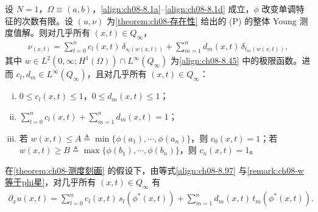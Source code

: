 \documentclass[../../main.tex]{subfiles}%
\begin{document}
\begin{theorem}\label{theorem:ch08-测度刻画}
设 $N=1$，$\Omega\equiv(a,b)$，\eqref{align:ch08-8.1a}--\eqref{align:ch08-8.1d} 成立，$\phi$ 改变单调特征的次数有限。设 $(u,\nu)$ 为\cref{theorem:ch08-存在性} 给出的 (P) 的整体 Young 测度值解。则对几乎所有 $(x,t)\in Q_\infty$，
\begin{align}
\nu_{(x,t)}=\sum_{l=0}^n c_l(x,t)\,\delta_{s_l(w(x,t))}
+\sum_{m=1}^n d_m(x,t)\,\delta_{t_m(w(x,t))}, \label{align:ch08-8.97}
\end{align}
其中 $w\in L^2(0,\infty;H^1(\Omega))\cap L^\infty(Q_\infty)$ 为\eqref{align:ch08-8.45} 中的极限函数。进而 $c_l,d_m\in L^\infty(Q_\infty)$，且对几乎所有 $(x,t)\in Q_\infty$：
\begin{enumerate}[(i)]
\item\label{item:ch08-char-i} $0\leqslant c_l(x,t)\leqslant1$，$0\leqslant d_m(x,t)\leqslant1$；
\item\label{item:ch08-char-ii} $\sum_{l=0}^n c_l(x,t)+\sum_{m=1}^n d_m(x,t)=1$；
\item\label{item:ch08-char-iii} 若 $w(x,t)\leqslant A\triangleq \min\{\phi(a_1),\cdots ,\phi(a_n)\}$，则 $c_0(x,t)=1$；若 $w(x,t)\geqslant B\triangleq \max\{\phi(b_1),\cdots ,\phi(b_n)\}$，则 $c_n(x,t)=1$。
\end{enumerate}
\end{theorem}

\begin{remark}\label{remark:ch08-导数公式}
在\cref{theorem:ch08-测度刻画} 的假设下，由等式\eqref{align:ch08-8.97} 与\cref{remark:ch08-w等于phi星}，对几乎所有 $(x,t)\in Q_\infty$ 有
\begin{align*}
\partial_x u(x,t)=\sum_{l=0}^n c_l(x,t)\,s_l(\phi^*(x,t))+\sum_{m=1}^n d_m(x,t)\,t_m(\phi^*(x,t)).
\end{align*}
\end{remark}
\end{document}
